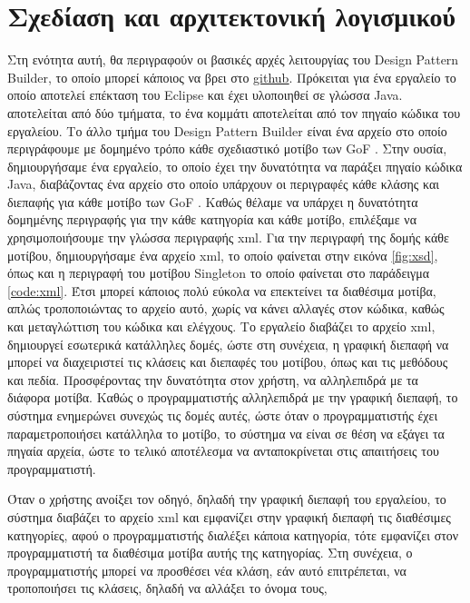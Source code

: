 \chapter{Σχεδίαση και αρχιτεκτονική λογισμικού}
\label{ch:architecture}
Στη ενότητα αυτή, θα περιγραφούν οι βασικές αρχές λειτουργίας του Design Pattern Builder, το οποίο μπορεί κάποιος να βρει 
στο \href{https://github.com/tasakos-dev/Design-pattern-builder}{\color{blue}\underline{github}}. 
Πρόκειται για ένα εργαλείο το οποίο αποτελεί επέκταση του Eclipse και έχει υλοποιηθεί σε γλώσσα Java. 
αποτελείται από δύο τμήματα, το ένα κομμάτι αποτελείται από τον πηγαίο κώδικα του εργαλείου. Το άλλο τμήμα του Design Pattern Builder είναι 
ένα αρχείο στο οποίο περιγράφουμε με δομημένο τρόπο κάθε σχεδιαστικό μοτίβο των GoF \cite{GoF}. Στην ουσία, δημιουργήσαμε ένα εργαλείο, 
το οποίο έχει την δυνατότητα να παράξει πηγαίο κώδικα Java, διαβάζοντας ένα αρχείο στο οποίο υπάρχουν οι περιγραφές 
κάθε κλάσης και διεπαφής για κάθε μοτίβο των GoF \cite{GoF}. Καθώς θέλαμε να υπάρχει η δυνατότητα δομημένης περιγραφής 
για την κάθε κατηγορία και κάθε μοτίβο, επιλέξαμε να χρησιμοποιήσουμε την γλώσσα περιγραφής xml. Για την περιγραφή της δομής κάθε μοτίβου, 
δημιουργήσαμε ένα αρχείο xml, το οποίο φαίνεται στην εικόνα \ref{fig:xsd}, όπως και η περιγραφή του μοτίβου Singleton \cite{GoF} 
το οποίο φαίνεται στο παράδειγμα \ref{code:xml}. Έτσι μπορεί κάποιος πολύ εύκολα να επεκτείνει τα διαθέσιμα μοτίβα, 
απλώς τροποποιώντας το αρχείο αυτό, χωρίς να κάνει αλλαγές στον κώδικα, καθώς και μεταγλώττιση του κώδικα και ελέγχους. 
Το εργαλείο διαβάζει το αρχείο xml, δημιουργεί εσωτερικά κατάλληλες δομές, ώστε στη συνέχεια, η γραφική διεπαφή 
να μπορεί να διαχειριστεί τις κλάσεις και διεπαφές του μοτίβου, όπως και τις μεθόδους και πεδία. Προσφέροντας την δυνατότητα στον χρήστη, 
να αλληλεπιδρά με τα διάφορα μοτίβα. Καθώς ο προγραμματιστής αλληλεπιδρά με την γραφική διεπαφή, 
το σύστημα ενημερώνει συνεχώς τις δομές αυτές, ώστε όταν ο προγραμματιστής έχει παραμετροποιήσει κατάλληλα το μοτίβο, 
το σύστημα να είναι σε θέση να εξάγει τα πηγαία αρχεία, ώστε το τελικό αποτέλεσμα να ανταποκρίνεται στις απαιτήσεις του προγραμματιστή.
\par
Όταν ο χρήστης ανοίξει τον οδηγό, δηλαδή την γραφική διεπαφή του εργαλείου, το σύστημα διαβάζει το αρχείο xml 
και εμφανίζει στην γραφική διεπαφή τις διαθέσιμες κατηγορίες, αφού ο προγραμματιστής διαλέξει κάποια κατηγορία, 
τότε εμφανίζει στον προγραμματιστή τα διαθέσιμα μοτίβα αυτής της κατηγορίας. Στη συνέχεια, 
ο προγραμματιστής μπορεί να προσθέσει νέα κλάση, εάν αυτό επιτρέπεται, να τροποποιήσει τις κλάσεις, δηλαδή να αλλάξει το όνομα τους, 
